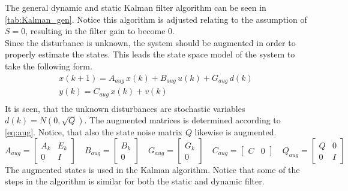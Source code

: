 The general dynamic and static Kalman filter algorithm can be seen in \cref{tab:Kalman_gen}. Notice this algorithm is adjusted relating to the assumption of $S=0$, resulting in the filter gain to  become 0.\\
Since the disturbance is unknown, the system should be augmented in order to properly estimate the states. This leads the state space model of the system to take the following form. 
\begin{equation}
    \begin{gathered}
        x(k+1)=A_{aug}\,x(k)+B_{aug}\,u(k)+G_{aug}\,d(k)\\
        y(k)=C_{aug}\,x(k)+v(k)\\
    \end{gathered} 
\end{equation}
It is seen, that the unknown disturbances are stochastic variables $d(k)=N(0,\sqrt{Q})$.  The augmented matrices is determined according to \cref{eq:aug}. Notice, that also the state noise matrix $Q$ likewise is augmented.
\begin{equation}
    A_{aug}=\begin{bmatrix} A_k & E_k \\ 0 & I \end{bmatrix} \quad
    B_{aug}=\begin{bmatrix} B_k \\ 0 \end{bmatrix} \quad
    G_{aug}=\begin{bmatrix} G_k \\ 0 \end{bmatrix} \quad
    C_{aug}=\begin{bmatrix} C & 0 \end{bmatrix} \quad
    Q_{aug}=\begin{bmatrix} Q & 0 \\ 0 & I \end{bmatrix}
    \label{eq:aug}
\end{equation}
The augmented states is used in the Kalman algorithm. Notice that some of the steps in the algorithm is similar for both the static and dynamic filter. 
